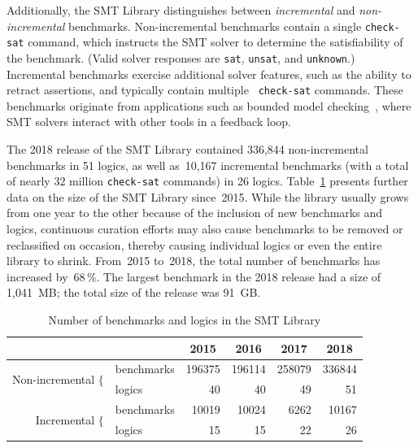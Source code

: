 \documentclass[dvipsnames,table,twoside,11pt]{article}
\begin{document}
Additionally, the SMT Library distinguishes between \emph{incremental}
and \emph{non-incremental} benchmarks.  Non-incremental benchmarks
contain a single {\tt check-sat} command, which instructs the SMT
solver to determine the satisfiability of the benchmark.  (Valid
solver responses are {\tt sat}, {\tt unsat}, and {\tt unknown}.)
Incremental benchmarks exercise additional solver features, such as
the ability to retract assertions, and typically contain multiple {\tt
  check-sat} commands.  These benchmarks originate from applications
such as bounded model
checking~\cite{Gunther:2014:IBS:2632362.2632374}, where SMT solvers
interact with other tools in a feedback loop.

The 2018 release of the SMT Library contained 336,844 non-incremental
benchmarks in 51 logics, as well as~10,167 incremental benchmarks
(with a total of nearly 32 million {\tt check-sat} commands) in 26
logics.  Table~\ref{table:smtlib} presents further data on the size of
the SMT Library since~2015.  While the library usually grows from one
year to the other because of the inclusion of new benchmarks and
logics, continuous curation efforts may also cause benchmarks to be
removed or reclassified on occasion, thereby causing individual logics
or even the entire library to shrink.  From~2015 to~2018, the total
number of benchmarks has increased by~68\,\%.  The largest benchmark
in the 2018 release had a size of 1,041~MB; the total size of the
release was 91~GB.

\begin{table}
  \caption{Number of benchmarks and logics in the SMT Library}
  \label{table:smtlib}
  \centering
  \begin{tabular}{r@{\ \ }lrrrr}
    \toprule
                               & & \multicolumn{1}{c}{2015} & \multicolumn{1}{c}{2016} & \multicolumn{1}{c}{2017} & \multicolumn{1}{c}{2018} \\
    \midrule
    \multirow{2}{*}{Non-incremental $\{$} & benchmarks & 196375 & 196114 & 258079 & 336844 \\
                                          & logics     &     40 &     40 &     49 &     51 \\
    \multirow{2}{*}{Incremental $\{$}     & benchmarks &  10019 &  10024 &   6262 &  10167 \\
                                          & logics     &     15 &     15 &     22 &     26 \\
    \bottomrule
  \end{tabular}
\end{table}
\end{document}

